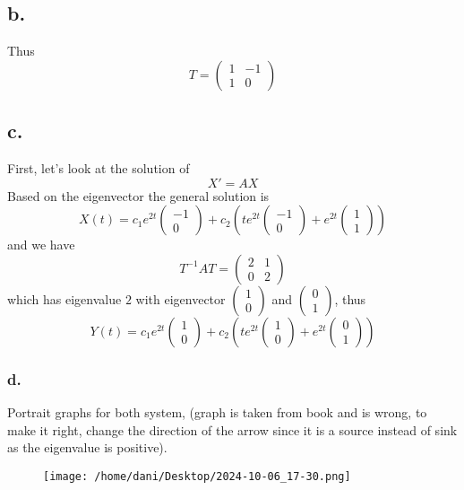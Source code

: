 \documentclass[11pt]{article}
\theoremstyle{mystyle}
\theoremstyle{definition}
\begin{document}
\subsection*{b.}
Thus 
\[
  T = 
  \begin{pmatrix}
    1 & -1\\
    1 & 0
  \end{pmatrix}
\]
\subsection*{c.}
First, let's look at the solution of 
\[
  X' = AX
\]
Based on the eigenvector the general solution is 
\[
  X(t) = c_1 e^{2t} 
  \begin{pmatrix}
    -1 \\
    0 
  \end{pmatrix}
  + c_2 \left(te^{2t} 
  \begin{pmatrix}
    -1 \\
    0
  \end{pmatrix}
  + e^{2t}
  \begin{pmatrix}
    1 \\
    1 
  \end{pmatrix}
    \right)
\]
and we have 
\[
  T^{-1} A T = 
  \begin{pmatrix}
    2 & 1 \\
    0 & 2 
  \end{pmatrix}
\]
which has eigenvalue $2$ with eigenvector $ \begin{pmatrix}
  1 \\ 0
\end{pmatrix}$ and $ \begin{pmatrix}
  0 \\ 1
\end{pmatrix}$,  thus 
\[
  Y(t) = c_1 e^{2t} 
  \begin{pmatrix}
    1 \\
    0 
  \end{pmatrix}
  + c_2 \left(te^{2t} 
  \begin{pmatrix}
    1 \\
    0
  \end{pmatrix}
  + e^{2t}
  \begin{pmatrix}
    0 \\
    1 
  \end{pmatrix}
    \right)
\]
\subsubsection*{d.}
Portrait graphs for both system, (graph is taken from book and is wrong, to make it right, change the direction of the arrow since it is a source instead of sink as the eigenvalue is positive).
\begin{figure}[h]
  \centering
  \texttt{[image: /home/dani/Desktop/2024-10-06\_17-30.png]}
  \caption{}
  \label{fig:2024-10-06_17-30}
\end{figure}
\end{document}
